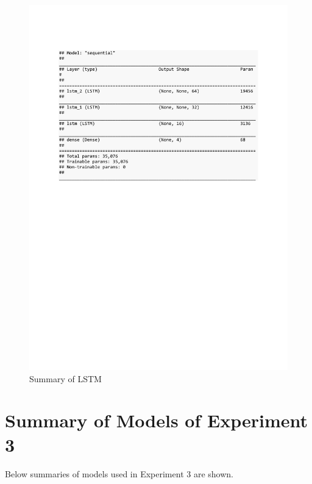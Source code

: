 \begin{figure}[h]
	\centering
	\includegraphics[scale=0.5]{Figures/summary_LSTM_pred_house_temp}
	\decoRule
	\caption[Experiment 2: Summary of LSTM for unsupervised learning]{Summary of LSTM \parencite{own}}
	\label{fig:summary_LSTM_pred_house_temp}
\end{figure}

\clearpage
\section{Summary of Models of Experiment 3}


Below summaries of models used in Experiment 3 are shown.


